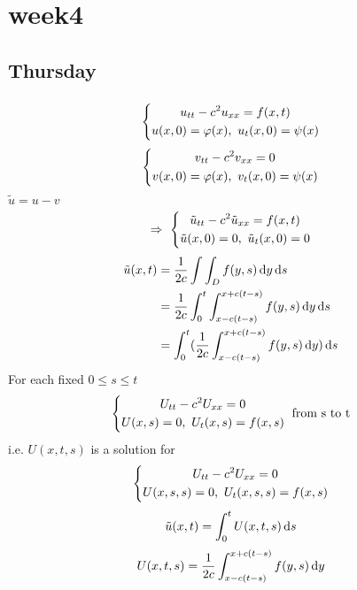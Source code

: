 
\chapter{week4}

\section{Thursday}
\subsection{}
\[\left\{\begin{gathered}u_{tt}-c^2u_{xx}=f(x,t)\\u(x,0)=\varphi(x),~ u_t(x,0)=\psi(x)\end{gathered}\right.
\]
\[\left\{\begin{gathered}v_{tt}-c^2v_{xx}=0\\v(x,0)=\varphi(x),~ v_t(x,0)=\psi(x)\end{gathered}\right.
\]
$\tilde{u}=u-v$
\[\Rightarrow ~\left\{\begin{gathered}\tilde{u}_{tt}-c^2\tilde{u}_{xx}=f(x,t)\\\tilde{u}(x,0)=0,~\tilde{u}_t(x,0)=0\end{gathered}\right.
\]
\[\begin{aligned}\tilde{u}(x,t)&=\frac{1}{2c}\int\int_Df(y,s)\,\mathrm{d} y\,\mathrm{d} s\\
&=\frac{1}{2c}\int_0^t\int_{x-c(t-s)}^{x+c(t-s)}f(y,s)\,\mathrm{d} y\,\mathrm{d} s\\
&=\int_0^t(\frac{1}{2c}\int_{x-c(t-s)}^{x+c(t-s)}f(y,s)\,\mathrm{d} y)\,\mathrm{d} s
\end{aligned}
\]
For each fixed $0\leq s\leq t$\\
\[\left\{\begin{gathered}U_{tt}-c^2U_{xx}=0\\U(x,s)=0,~ U_t(x,s)=f(x,s)\end{gathered}\right.\text{  from s to t}
\]
i.e. $U(x,t,s)$ is a solution for 
\[\left\{\begin{gathered}U_{tt}-c^2U_{xx}=0\\U(x,s,s)=0,~U_t(x,s,s)=f(x,s)\end{gathered}\right.
\]
\[\tilde{u}(x,t)=\int_0^tU(x,t,s)\,\mathrm{d} s 
\]
\[U(x,t,s)=\frac{1}{2c}\int_{x-c(t-s)}^{x+c(t-s)}f(y,s)\,\mathrm{d} y
\]

